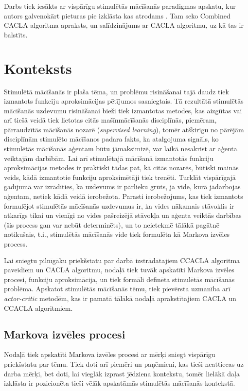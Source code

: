 \documentclass{ludis} %
\begin{document}
Darbs tiek iesākts ar vispārīgu stimulētās mācīšanās paradigmas apskatu, kur
autors galvenokārt pieturas pie izklāsta kas atrodams \autocite{Krislauks2015}.
Tam seko Combined CACLA algoritma apraksts, un salīdzinājums ar CACLA algoritmu, uz
kā tas ir balstīts.


\chapter{Konteksts}
Stimulētā mācīšanās ir plaša tēma, un problēmu risināšanai tajā daudz tiek
izmantots funkciju aproksimācijas pētījumos sasniegtais. Tā rezultātā stimulētās
mācīšanās uzdevumu risināšanai bieži tiek izmantotas metodes, kas aizgūtas vai
arī tiešā veidā tiek lietotas citās mašīnmācīšanās disciplīnās, piemēram,
pārraudzītās mācīšanās nozarē (\textit{supervised learning}), tomēr atšķirīgu
no pārējām disciplīnām stimulēto mācīšanos padara fakts, ka atalgojuma signāls,
ko stimulētās mācīšanās aģentam būtu jāmaksimizē, var laikā nesakrist ar aģenta
veiktajām darbībām. Lai arī stimulētajā mācīšanā izmantotās funkciju
aproksimācijas metodes ir praktiski tādas pat, kā citās nozarēs, būtiski mainās
veids, kādā izmantotie funkciju aproksimētāji tiek trenēti. Turklāt vispārīgajā
gadījumā var izrādīties, ka uzdevums ir pārlieku grūts, ja vide, kurā jādarbojas
aģentam, netiek kādā veidā ierobežota. Parasti ierobežojums, kas tiek izmantots
formulējot stimulētās mācīšanās uzdevumus ir, ka vides nākamais stāvoklis ir
atkarīgs tikai un vienīgi no vides pašreizējā stāvokļa un aģenta veiktās
darbības (šis process gan var nebūt determinēts), un to neietekmē tālākā
pagātnē notikušais, t.i., stimulētās mācīšanās vide tiek formulēta kā Markova
izvēles process.

Lai sniegtu pilnīgāku priekšstatu par darbā izstrādātajiem CCACLA algoritma
paveidiem un CACLA algoritmu, nodaļā tiek tuvāk apskatīti Markova izvēles
procesi, funkciju aproksimācija, un tiek formāli definēta stimulētās mācīšanās
problēma. Apskatot stimulētās mācīšanās tēmu, tiek pievērsta uzmanība arī
\textit{actor-critic} metodēm, kas ir pamatā tālākā nodaļā aprakstītajiem CACLA
un CCACLA algoritmiem.
\section{Markova izvēles procesi} \label{sec:mdp}
Nodaļā tiek apskatīti Markova izvēles procesi ar mērķi sniegt vispārīgu
priekšstatu par tēmu. Tiek doti arī piemēri un paņēmieni, kas tieši neattiecas
uz darba mērķi, bet doti, lai vieglāk izprast jēdziena kontekstu, tomēr lielākā
daļa izklāsta ir pozicionēta tieši vēlāk apskatāmās stimulētās mācīšanās
kontekstā.
\end{document}
